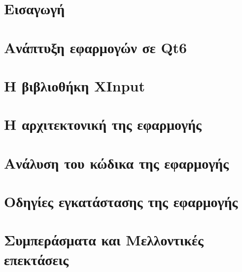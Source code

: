 \documentclass[a4paper,11pt,oneside,openany]{ioniothesis}
\begin{document}
\cleardoublepage

\cleardoublepage

\tableofcontents


\setlength{\parskip}{5pt}

\pagestyle{headings}
\cleardoublepage

\newpage
{}

\cleardoublepage

\chapter{Εισαγωγή} \label{chapter:intro}


\chapter{Ανάπτυξη εφαρμογών σε Qt6} \label{chapter:qt6}


\chapter{Η βιβλιοθήκη XInput} \label{chapter:xinput}


\chapter{Η αρχιτεκτονική της εφαρμογής} \label{chapter:app}


\chapter{Ανάλυση του κώδικα της εφαρμογής} \label{chapter:source}


\chapter{Οδηγίες εγκατάστασης της εφαρμογής} \label{chapter:installation}


\chapter{Συμπεράσματα και Μελλοντικές επεκτάσεις} \label{chapter:telos}


\begin{thebibliography}{99} 
\pagestyle{headings}

\end{thebibliography}
\end{document}
